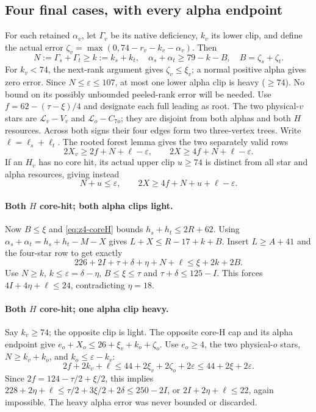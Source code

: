 \documentclass[11pt,letterpaper]{article}
\theoremstyle{definition}\newtheorem{definition}[theorem]{Definition}
\begin{document}
\subsection{Four final cases, with every alpha endpoint}
For each retained $\alpha_v$, let $\Gamma_v$ be its native deficiency, $k_v$ its lower clip, and define the actual error
$\zeta_v=\max(0,74-r_v-k_v-\alpha_v)$.
Then
\[
 N:=\Gamma_s+\Gamma_t\ge k:=k_s+k_t,\quad
 \alpha_s+\alpha_t\ge79-k-B,\quad B=\zeta_s+\zeta_t.
\]
For $k_v<74$, the next-rank argument gives $\zeta_v\le\xi_v$; a normal positive alpha gives zero error. Since $N\le\varepsilon\le107$, at most one lower alpha clip is heavy ($\ge74$). No bound on its possibly unbounded peeled-rank error will be needed.
Use $f=62-(\tau-\xi)/4$ and designate each full leading as root. The two physical-$v$ stars are $\mathcal L_v-V_v$ and $\mathcal L_o-C_{7o}$; they are disjoint from both alphas and both $H$ resources. Across both signs their four edges form two three-vertex trees. Write $\ell=\ell_s+\ell_t$. The rooted forest lemma gives the two separately valid rows
\begin{equation}\label{eq:z4stars}
 2X_v\ge2f+N+\ell-\varepsilon,\qquad
 2X\ge4f+N+\ell-\varepsilon.
\end{equation}
If an $H_v$ has no core hit, its actual upper clip $u\ge74$ is distinct from all star and alpha resources, giving instead
\begin{equation}\label{eq:z4starsH}
 N+u\le\varepsilon,\qquad2X\ge4f+N+u+\ell-\varepsilon.
\end{equation}

\paragraph{Both $H$ core-hit; both alpha clips light.}
Now $B\le\xi$ and \eqref{eq:z4-coreH} bounds $h_s+h_t\le2R+62$.
Using $\alpha_s+\alpha_t=h_s+h_t-M-X$ gives $L+X\le R-17+k+B$.
Insert $L\ge A+41$ and the four-star row to get exactly
\[
 226+2I+\tau+\delta+\eta+N+\ell\le\xi+2k+2B.
\]
Use $N\ge k$, $k\le\varepsilon=\delta-\eta$, $B\le\xi\le\tau$ and $\tau+\delta\le125-I$. This forces
$4I+4\eta+\ell\le24$, contradicting $\eta=18$.

\paragraph{Both $H$ core-hit; one alpha clip heavy.}
Say $k_v\ge74$; the opposite clip is light. The opposite core-H cap and its alpha endpoint give
$e_o+X_o\le26+\xi_v+k_o+\zeta_o$.
Use $e_o\ge4$, the two physical-$o$ stars, $N\ge k_v+k_o$, and $k_o\le\varepsilon-k_v$:
\[
 2f+2k_v+\ell\le44+2\xi_v+2\zeta_o+2\varepsilon\le44+2\xi+2\varepsilon.
\]
Since $2f=124-\tau/2+\xi/2$, this implies
$228+2\eta+\ell\le\tau/2+3\xi/2+2\delta\le250-2I$,
or $2I+2\eta+\ell\le22$, again impossible. The heavy alpha error was never bounded or discarded.
\end{document}
